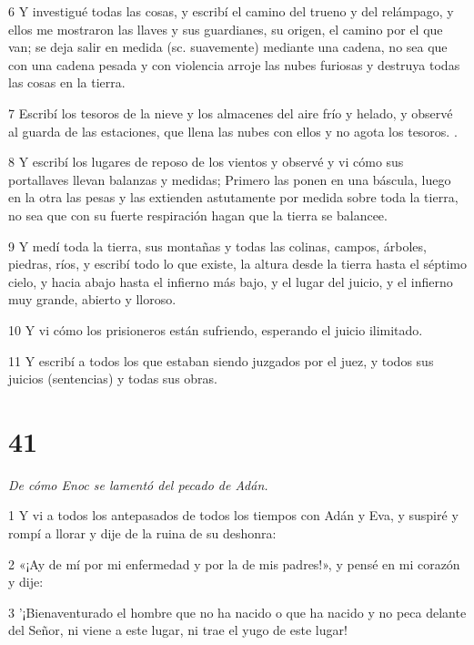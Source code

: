 \par 6 Y investigué todas las cosas, y escribí el camino del trueno y del relámpago, y ellos me mostraron las llaves y sus guardianes, su origen, el camino por el que van; se deja salir en medida (sc. suavemente) mediante una cadena, no sea que con una cadena pesada y con violencia arroje las nubes furiosas y destruya todas las cosas en la tierra.

\par 7 Escribí los tesoros de la nieve y los almacenes del aire frío y helado, y observé al guarda de las estaciones, que llena las nubes con ellos y no agota los tesoros. .

\par 8 Y escribí los lugares de reposo de los vientos y observé y vi cómo sus portallaves llevan balanzas y medidas; Primero las ponen en una báscula, luego en la otra las pesas y las extienden astutamente por medida sobre toda la tierra, no sea que con su fuerte respiración hagan que la tierra se balancee.

\par 9 Y medí toda la tierra, sus montañas y todas las colinas, campos, árboles, piedras, ríos, y escribí todo lo que existe, la altura desde la tierra hasta el séptimo cielo, y hacia abajo hasta el infierno más bajo, y el lugar del juicio, y el infierno muy grande, abierto y lloroso.

\par 10 Y vi cómo los prisioneros están sufriendo, esperando el juicio ilimitado.

\par 11 Y escribí a todos los que estaban siendo juzgados por el juez, y todos sus juicios (sentencias) y todas sus obras.

\chapter{41}

\par \textit{De cómo Enoc se lamentó del pecado de Adán.}

\par 1 Y vi a todos los antepasados ​​de todos los tiempos con Adán y Eva, y suspiré y rompí a llorar y dije de la ruina de su deshonra:

\par 2 «¡Ay de mí por mi enfermedad y por la de mis padres!», y pensé en mi corazón y dije:

\par 3 '¡Bienaventurado el hombre que no ha nacido o que ha nacido y no peca delante del Señor, ni viene a este lugar, ni trae el yugo de este lugar!


